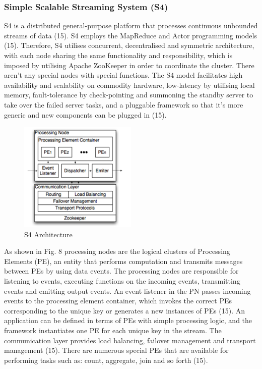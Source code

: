 \subsubsection{Simple Scalable Streaming System (S4)} \label{subsubsec-lr-reallayer-s4}
S4 is a distributed general-purpose platform that processes continuous unbounded streams of data (15). S4 employs the MapReduce and Actor programming models (15). Therefore, S4 utilises concurrent, decentralised and symmetric architecture, with each node sharing the same functionality and responsibility, which is imposed by utilising Apache ZooKeeper in order to coordinate the cluster. There aren’t any special nodes with special functions. The S4 model facilitates high availability and scalability on commodity hardware, low-latency by utilising local memory, fault-tolerance by check-pointing and summoning the standby server to take over the failed server tasks, and a pluggable framework so that it's more generic and new components can be plugged in (15).

\begin{figure}[H]
\centering
\includegraphics[width=0.5\textwidth]{Figures/s4.png}
\caption{S4 Architecture}\label{fig-real-s4}
\end{figure}

As shown in Fig. 8 processing nodes are the logical clusters of Processing Elements (PE), an entity that performs computation and transmits messages between PEs by using data events. The processing nodes are responsible for listening to events, executing functions on the incoming events, transmitting events and emitting output events. An event listener in the PN passes incoming events to the processing element container, which invokes the correct PEs corresponding to the unique key or generates a new instances of PEs (15). An application can be defined in terms of PEs with simple processing logic, and the framework instantiates one PE for each unique key in the stream. The communication layer provides load balancing, failover management and transport management (15). There are numerous special PEs that are available for performing tasks such as: count, aggregate, join and so forth (15).

